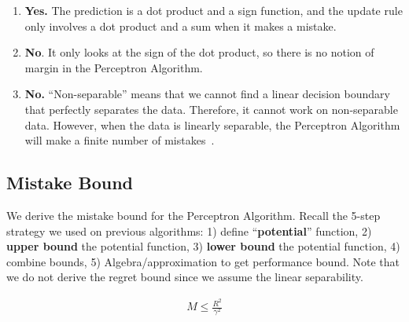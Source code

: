 \documentclass[11pt]{article}
\begin{document}
\begin{enumerate}
    \item \textit{{\color{blue}{Is it fast?}}} \textbf{Yes.} The prediction is a dot product and a sign function, and the update rule only involves a dot product and a sum when it makes a mistake.
    \item \textit{{\color{blue}{Is it a Large Margin classifier?}}} \textbf{No}. It only looks at the sign of the dot product, so there is no notion of margin in the Perceptron Algorithm.
    \item \textit{{\color{blue}{Does it work on non-separable data?}}}  \textbf{No.} ``Non-separable'' means that we cannot find a linear decision boundary that perfectly separates the data. Therefore, it cannot work on non-separable data. However, when the data is linearly separable, the Perceptron Algorithm will make a finite number of mistakes~\cite{novikoff1963convergence}.
\end{enumerate}

\subsection{Mistake Bound}
We derive the mistake bound for the Perceptron Algorithm. Recall the 5-step strategy we used on previous algorithms: 1) define ``\textbf{potential}'' function, 2) \textbf{upper bound} the potential function, 3) \textbf{lower bound} the potential function, 4) combine bounds, 5) Algebra/approximation to get performance bound. Note that we do not derive the regret bound since we assume the linear separability.


\begin{align}
    M \leq \frac{R^{2}}{\gamma^{2}}
\end{align}
\end{document}

